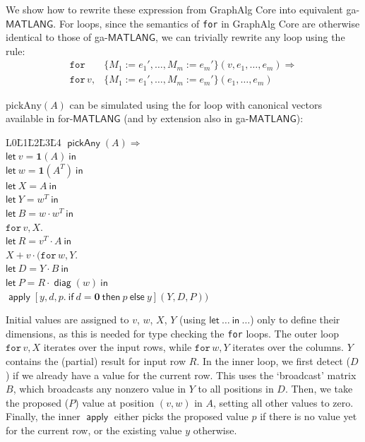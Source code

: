 \documentclass{article}
\newcommand\graphalg{\textsf{GraphAlg}}
\DeclareMathOperator{\pickAny}{\mathsf{pickAny}}
\newcommand{\ML}{\mathsf{MATLANG}}
\newcommand{\transp}[1]{#1^T}
\newcommand{\SyntaxStyle}{\mathsf}
\newcommand{\rowdom}{\mathbf{1}}
\DeclareMathOperator{\diag}{\mathsf{diag}}
\DeclareMathOperator{\Apply}{\mathsf{apply}}
\newcommand{\one}{\rowdom}
\begin{document}
We show how to rewrite these expression from \graphalg{} Core into equivalent ga-$\ML$.
For loops, since the semantics of \texttt{for} in \graphalg{} Core are otherwise identical to those of ga-$\ML$, we can trivially rewrite any loop using the rule:
\begin{align*}
    \texttt{for}\ \ \  & \{ M_1 := e_1', \ldots, M_m := e_m' \}(v, e_1, \ldots, e_m)
    \Rightarrow                                                                      \\
    \texttt{for}\, v,  & \{ M_1 := e_1', \ldots, M_m := e_m' \}(e_1, \ldots, e_m)
\end{align*}

$\text{pickAny}(A)$ can be simulated using the for loop with canonical vectors available in for-$\ML$ (and by extension also in ga-$\ML$):

\begin{tabbing}
    L0\=L1\=L2\=L3\=L4 \kill
    $\pickAny(A) \Rightarrow$ \\
    $\SyntaxStyle{let}\ v = \one(A) \ \SyntaxStyle{in}$ \\
    $\SyntaxStyle{let}\ w = \one(\transp{A}) \ \SyntaxStyle{in}$ \\
    $\SyntaxStyle{let}\ X = A \ \SyntaxStyle{in}$ \\
    $\SyntaxStyle{let}\ Y = \transp{w} \ \SyntaxStyle{in}$ \\
    $\SyntaxStyle{let}\ B = w \cdot \transp{w} \ \SyntaxStyle{in}$ \\
    $\texttt{for}\, v,X \texttt{.}\,$\\
    \>$\SyntaxStyle{let}\ R = \transp{v} \cdot A \ \SyntaxStyle{in}$ \\
    \>$X + v \cdot (\texttt{for}\, w,Y \texttt{.}\,$\\
        \>\>$\SyntaxStyle{let}\ D=Y \cdot B\ \SyntaxStyle{in}$ \\
        \>\>$\SyntaxStyle{let}\ P=R \cdot \diag(w)\ \SyntaxStyle{in}$ \\
        \>\>$\Apply[y, d, p.\ \SyntaxStyle{if}\ d = \mathbf{0}\ \SyntaxStyle{then}\ p\ \SyntaxStyle{else}\ y](Y, D, P))$\\
\end{tabbing}

Initial values are assigned to $v$, $w$, $X$, $Y$ (using $\SyntaxStyle{let}\ \ldots \ \SyntaxStyle{in}\ \ldots$) only to define their dimensions, as this is needed for type checking the \texttt{for} loops.
The outer loop $\texttt{for}\, v,X$ iterates over the input rows, while $\texttt{for}\, w,Y$ iterates over the columns.
$Y$ contains the (partial) result for input row $R$.
In the inner loop, we first detect ($D$) if we already have a value for the current row.
This uses the `broadcast' matrix $B$, which broadcasts any nonzero value in $Y$ to all positions in $D$.
Then, we take the proposed ($P$) value at position $(v, w)$ in $A$, setting all other values to zero.
Finally, the inner $\Apply$ either picks the proposed value $p$ if there is no value yet for the current row, or the existing value $y$ otherwise.



\end{document}
